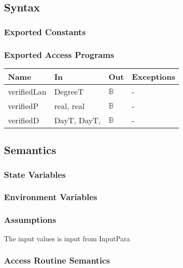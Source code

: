 \documentclass[12pt, titlepage]{article}
\begin{document}
\subsection{Syntax}

\subsubsection{Exported Constants}


\subsubsection{Exported Access Programs}

\begin{center}
\begin{tabular}{p{2cm} p{5cm} p{2cm} p{5cm}}
\hline
\textbf{Name} & \textbf{In} & \textbf{Out} & \textbf{Exceptions} \\
\hline 
verifiedLan & DegreeT& $\mathbb{B}$ & - \\
verifiedP &  real, real & $\mathbb{B}$ & - \\
verifiedD & DayT, DayT, & $\mathbb{B}$ & - \\
\hline
\end{tabular}
\end{center}


\subsection{Semantics}

\subsubsection{State Variables}



\subsubsection{Environment Variables}


\subsubsection{Assumptions}
The input values is input from InputPara


\subsubsection{ Access Routine Semantics}
\end{document}
